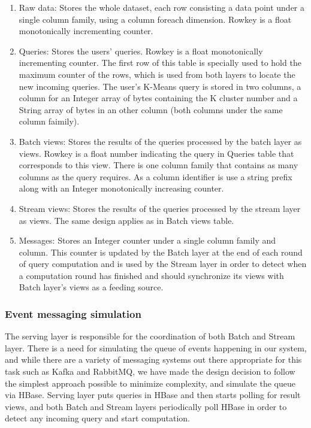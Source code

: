 \documentclass{lmproj}
\begin{document}
\begin{enumerate}
	\item Raw data: Stores the whole dataset, each row consisting a data point under a single column family, using a column foreach dimension. Rowkey is a float monotonically incrementing counter.
	\item Queries: Stores the users' queries. Rowkey is a float monotonically incrementing counter. The first row of this table is specially used to hold the maximum counter of the rows, which is used from both layers to locate the new incoming queries. The user's K-Means query is stored in two columns, a column for an Integer array of bytes containing the K cluster number and a String array of bytes in an other column (both columns under the same column faimily).
	\item Batch views: Stores the results of the queries processed by the batch layer as views. Rowkey is a float number indicating the query in Queries table that corresponds to this view. There is one column family that contains as many columns as the query requires. As a column identifier is use a string prefix along with an Integer monotonically increasing counter.
	\item Stream views: Stores the results of the queries processed by the stream layer as views. The same design applies as in Batch views table.
	\item Messages: Stores an Integer counter under a single column family and column. This counter is updated by the Batch layer at the end of each round of query computation and is used by the Stream layer in order to detect when a computation round has finished and should synchronize its views with Batch layer's views as a feeding source. 
\end{enumerate}

\subsubsection{Event messaging simulation}
The serving layer is responsible for the coordination of both Batch and Stream layer. There is a need for simulating the queue of events happening in our system, and while there are a variety of messaging systems out there appropriate for this task such as Kafka and RabbitMQ, we have made the design decision to follow the simplest approach possible to minimize complexity, and simulate the queue via HBase. Serving layer puts queries in HBase and then starts polling for result views, and both Batch and Stream layers periodically poll HBase in order to detect any incoming query and start computation.
\end{document}
